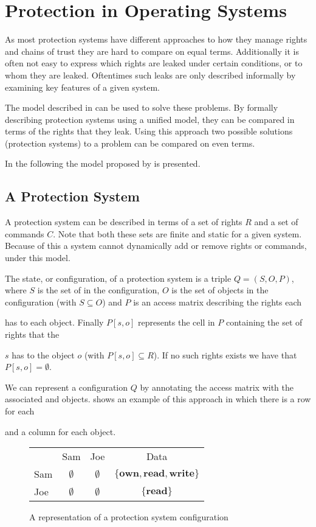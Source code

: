 \section{Protection in Operating Systems}
As most protection systems have different approaches to how they manage rights and chains of trust they are hard to compare on equal terms.
Additionally it is often not easy to express which rights are leaked under certain conditions, or to whom they are leaked.
Oftentimes such leaks are only described informally by examining key features of a given system.

The model described in \citet{HRU} can be used to solve these problems.
By formally describing protection systems using a unified model, they can be compared in terms of the rights that they leak.
Using this approach two possible solutions (protection systems) to a problem can be compared on even terms.

In the following the model proposed by \citet{HRU} is presented.

\subsection{A Protection System}
A protection system can be described in terms of a set of rights $R$ and a set of commands $C$.
Note that both these sets are finite and static for a given system.
Because of this a system cannot dynamically add or remove rights or commands, under this model.

\begin{definition}
The state, or configuration, of a protection system is a triple $Q = (S, O, P)$, where $S$ is the set of \subjects{} in the configuration, $O$ is the set of objects in the configuration (with $S \subseteq O$) and $P$ is an access matrix describing the rights each \subject{} has to each object.
Finally $P[s, o]$ represents the cell in $P$ containing the set of rights that the \subject{} $s$ has to the object $o$ (with $P[s, o] \subseteq R$).
If no such rights exists we have that $P[s,o] = \emptyset$.
\end{definition}

We can represent a configuration $Q$ by annotating the access matrix with the associated \subjects{} and objects.
 shows an example of this approach in which there is a row for each \subject{} and a column for each object.

\begin{figure}[h]
\centering
\begin{tabular}{l|c|c|c|}
\multicolumn{1}{c}{} & \multicolumn{1}{c}{Sam} & \multicolumn{1}{c}{Joe} & \multicolumn{1}{c}{Data} \\\cline{2-4}
Sam & $\emptyset$ & $\emptyset$ & $\{\textbf{own}, \textbf{read}, \textbf{write}\}$ \\\cline{2-4}
Joe & $\emptyset$ & $\emptyset$ & $\{\textbf{read}\}$ \\\cline{2-4}
\end{tabular}
\caption{A representation of a protection system configuration}
\label{protection:matrixsmall}
\end{figure}

